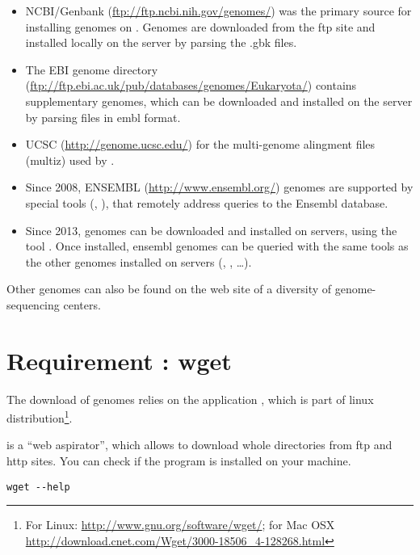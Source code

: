 \begin{itemize}

\item NCBI/Genbank (\url{ftp://ftp.ncbi.nih.gov/genomes/}) was the
  primary source for installing genomes on \RSAT. Genomes are
  downloaded from the ftp site and installed locally on the \RSAT
  server by parsing the .gbk files.


\item The EBI genome directory
  (\url{ftp://ftp.ebi.ac.uk/pub/databases/genomes/Eukaryota/})
  contains supplementary genomes, which can be downloaded and
  installed on the \RSAT server by parsing files in embl format.

\item UCSC (\url{http://genome.ucsc.edu/}) for the multi-genome
  alingment files (multiz) used by .

\item Since 2008, ENSEMBL (\url{http://www.ensembl.org/}) genomes are
  supported by special tools (,
  ), that remotely address
  queries to the Ensembl database.

\item Since 2013, genomes can be downloaded and installed on \RSAT
  servers, using the tool . Once
  installed, ensembl genomes can be queried with the same tools as the
  other genomes installed on \RSAT servers (,
  , \ldots).

\end{itemize}

Other genomes can also be found on the web site of a diversity of
genome-sequencing centers.

\section{Requirement : wget}

The download of genomes relies on the application ,
which is part of linux distribution\footnote{For Linux:
  \url{http://www.gnu.org/software/wget/}; for Mac OSX
  \url{http://download.cnet.com/Wget/3000-18506_4-128268.html}}.


 is a ``web aspirator'', which allows to download whole
directories from ftp and http sites. You can check if the program is
installed on your machine.

\begin{lstlisting}
wget --help
\end{lstlisting}


